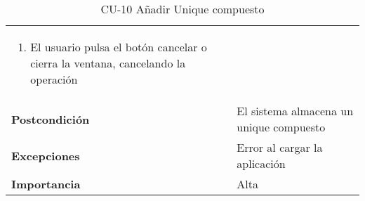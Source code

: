 \begin{table}[p]
\begin{tabularx}{\linewidth}{ p{} p{}}
\begin{enumerate}
\begin{enumerate}
\begin{itemize}
                \end{itemize}
                \item El usuario pulsa el botón cancelar o cierra la ventana, cancelando la operación
            \end{enumerate}
		\end{enumerate}\\
		\textbf{Postcondición}        & El sistema almacena un unique compuesto \\
		\textbf{Excepciones}          & Error al cargar la aplicación \\
		\textbf{Importancia}          & Alta \\
		\bottomrule
    \end{tabularx}
    \caption{CU-10 Añadir Unique compuesto}
\end{table}

